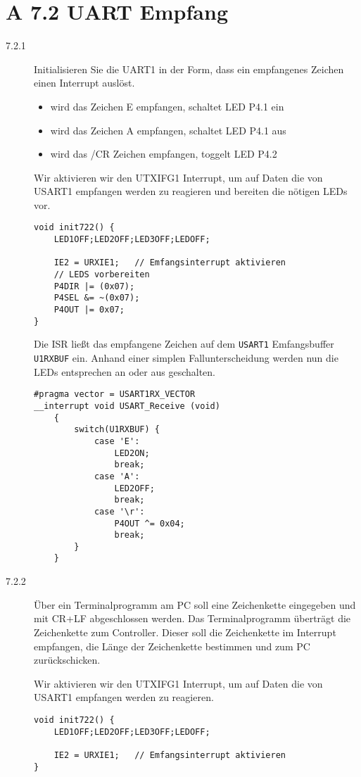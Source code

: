 \documentclass[11pt,a4paper,ngerman]{article}
\begin{document}
\section*{A 7.2 UART Empfang}
\begin{description}
\item[7.2.1] Initialisieren Sie die UART1 in der Form, dass ein empfangenes Zeichen einen Interrupt auslöst.
\begin{itemize}
	\item wird das Zeichen E empfangen, schaltet LED P4.1 ein
	\item wird das Zeichen A empfangen, schaltet LED P4.1 aus
	\item wird das /CR Zeichen empfangen, toggelt LED P4.2
\end{itemize}

Wir aktivieren wir den UTXIFG1 Interrupt, um auf Daten die von USART1 empfangen werden zu reagieren und
bereiten die nötigen LEDs vor.
\begin{lstlisting}
void init722() {
    LED1OFF;LED2OFF;LED3OFF;LEDOFF;
    
    IE2 = URXIE1;	// Emfangsinterrupt aktivieren
    // LEDS vorbereiten
    P4DIR |= (0x07);
    P4SEL &= ~(0x07);
    P4OUT |= 0x07;
}
\end{lstlisting}

Die ISR ließt das empfangene Zeichen auf dem \lstinline|USART1| Emfangsbuffer \lstinline|U1RXBUF| ein.
Anhand einer simplen Fallunterscheidung werden nun die LEDs entsprechen an oder aus geschalten.
\begin{lstlisting}
#pragma vector = USART1RX_VECTOR
__interrupt void USART_Receive (void)
	{
		switch(U1RXBUF) {
			case 'E':
				LED2ON;
				break;
			case 'A':
				LED2OFF;
				break;
			case '\r':
				P4OUT ^= 0x04;
				break;				
		}
	}
\end{lstlisting}

\item[7.2.2] Über ein Terminalprogramm am PC soll eine Zeichenkette eingegeben und mit CR+LF abgeschlossen werden. Das Terminalprogramm überträgt die Zeichenkette zum Controller. Dieser soll die Zeichenkette im Interrupt empfangen, die Länge der Zeichenkette bestimmen und zum PC zurückschicken.

Wir aktivieren wir den UTXIFG1 Interrupt, um auf Daten die von USART1 empfangen werden zu reagieren.
\begin{lstlisting}
void init722() {
    LED1OFF;LED2OFF;LED3OFF;LEDOFF;
    
    IE2 = URXIE1;	// Emfangsinterrupt aktivieren
}
\end{lstlisting}


\end{description}
\end{document}
